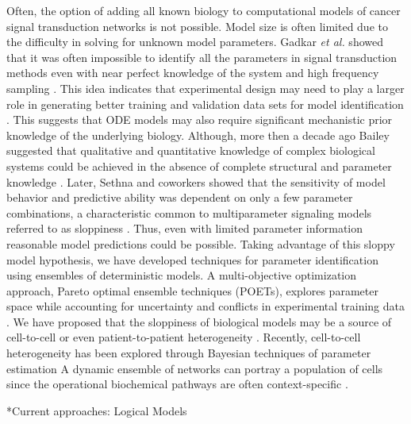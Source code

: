 \documentclass[12pt]{article}
\makeatletter
\renewcommand\subsection{\@startsection
	{subsection}{2}{0mm}
	{-0.05in}
	{-0.5\baselineskip}
	{\normalfont\normalsize\bfseries}}
\makeatother
\begin{document}
Often, the option of adding all known biology to computational models of cancer signal transduction networks is not possible. Model size is often limited due to the difficulty in solving for unknown model parameters. Gadkar \textit{et al.} showed that it was often impossible to identify all the parameters in signal transduction methods even with near perfect knowledge of the system and high frequency sampling \cite{Gadkar2005}. This idea indicates that experimental design may need to play a larger role in generating better training and validation data sets for model identification \cite{Apgar2010}. This suggests that ODE models may also require significant mechanistic prior knowledge of the underlying biology. Although, more then a decade ago Bailey suggested that qualitative and quantitative knowledge of complex biological systems could be achieved in the absence of complete structural and parameter knowledge \cite{Bailey2001}. Later, Sethna and coworkers showed that the sensitivity of model behavior and predictive ability was dependent on only a few parameter combinations, a characteristic common to multiparameter signaling models referred to as sloppiness \cite{Daniels2008}. Thus, even with limited parameter information reasonable model predictions could be possible. Taking advantage of this sloppy model hypothesis, we have developed techniques for parameter identification using ensembles of deterministic models. A multi-objective optimization approach, Pareto optimal ensemble techniques (POETs), explores parameter space while accounting for uncertainty and conflicts in experimental training data \cite{Song2010}. We have proposed that the sloppiness of biological models may be a source of cell-to-cell \cite{Lequieu2011} or even patient-to-patient heterogeneity \cite{Luan2010}. Recently, cell-to-cell heterogeneity has been explored through Bayesian techniques of parameter estimation \cite{Hasenauer2011} %
A dynamic ensemble of networks can portray a population of cells since the operational biochemical pathways are often context-specific \cite{Creixell2012}.    

\subsection*{Current approaches: Logical Models}
\end{document}

